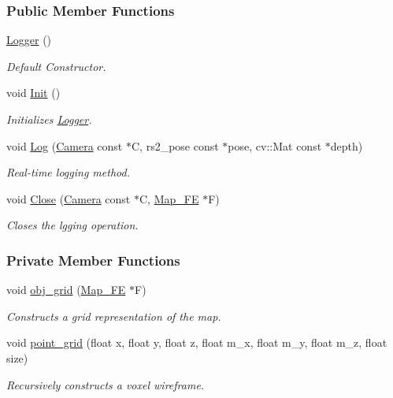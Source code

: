 \subsubsection*{Public Member Functions}
\begin{DoxyCompactItemize}
\item 
\hyperlink{classLogger_abc41bfb031d896170c7675fa96a6b30c}{Logger} ()
\begin{DoxyCompactList}\small\item\em Default Constructor. \end{DoxyCompactList}\item 
void \hyperlink{classLogger_a42c282f4c0e2c6557d16e2967c1ddf7e}{Init} ()
\begin{DoxyCompactList}\small\item\em Initializes \hyperlink{classLogger}{Logger}. \end{DoxyCompactList}\item 
void \hyperlink{classLogger_adcc95257ff2edceded8e272dac3603ce}{Log} (\hyperlink{classCamera}{Camera} const $\ast$C, rs2\+\_\+pose const $\ast$pose, cv\+::\+Mat const $\ast$depth)
\begin{DoxyCompactList}\small\item\em Real-\/time logging method. \end{DoxyCompactList}\item 
void \hyperlink{classLogger_a6b670ceb54a249eb83da08a1914d2be8}{Close} (\hyperlink{classCamera}{Camera} const $\ast$C, \hyperlink{classMap__FE}{Map\+\_\+\+FE} $\ast$F)
\begin{DoxyCompactList}\small\item\em Closes the lgging operation. \end{DoxyCompactList}\end{DoxyCompactItemize}
\subsubsection*{Private Member Functions}
\begin{DoxyCompactItemize}
\item 
void \hyperlink{classLogger_ac58fee4bd66a5359deb29a86948d584d}{obj\+\_\+grid} (\hyperlink{classMap__FE}{Map\+\_\+\+FE} $\ast$F)
\begin{DoxyCompactList}\small\item\em Constructs a grid representation of the map. \end{DoxyCompactList}\item 
void \hyperlink{classLogger_a38c5de03e0de7deffd7b516b13f826ff}{point\+\_\+grid} (float x, float y, float z, float m\+\_\+x, float m\+\_\+y, float m\+\_\+z, float size)
\begin{DoxyCompactList}\small\item\em Recursively constructs a voxel wireframe. \end{DoxyCompactList}\end{DoxyCompactItemize}
